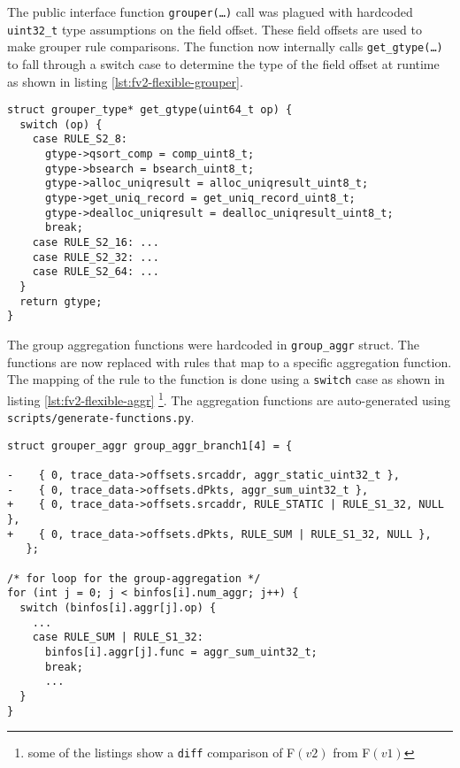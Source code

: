 The public interface function \texttt{grouper(\ldots)} call was plagued with
hardcoded \texttt{uint32\_t} type assumptions on the field offset. These field
offsets  are used to
make grouper rule comparisons. The function now internally calls
\texttt{get\_gtype(\ldots)} to fall through a switch case to determine the
type of the field offset at runtime as shown in listing
\ref{lst:fv2-flexible-grouper}.

\begin{lstlisting}
struct grouper_type* get_gtype(uint64_t op) {
  switch (op) {
    case RULE_S2_8:
      gtype->qsort_comp = comp_uint8_t;
      gtype->bsearch = bsearch_uint8_t;
      gtype->alloc_uniqresult = alloc_uniqresult_uint8_t;
      gtype->get_uniq_record = get_uniq_record_uint8_t;
      gtype->dealloc_uniqresult = dealloc_uniqresult_uint8_t;
      break;
    case RULE_S2_16: ...
    case RULE_S2_32: ...
    case RULE_S2_64: ...
  }
  return gtype;
}
\end{lstlisting}



The group aggregation functions were hardcoded in \texttt{group\_aggr} struct.
The functions  are now replaced with
rules that map to a specific aggregation function. The mapping of the rule to
the function is done using a \texttt{switch} case as shown in listing
\ref{lst:fv2-flexible-aggr} \footnote{some of the listings show a
\texttt{diff} comparison of F$(v2)$ from F$(v1)$}. The aggregation functions
are auto-generated using \texttt{scripts/generate-functions.py}.

\begin{lstlisting}
struct grouper_aggr group_aggr_branch1[4] = {

-    { 0, trace_data->offsets.srcaddr, aggr_static_uint32_t },
-    { 0, trace_data->offsets.dPkts, aggr_sum_uint32_t },
+    { 0, trace_data->offsets.srcaddr, RULE_STATIC | RULE_S1_32, NULL },
+    { 0, trace_data->offsets.dPkts, RULE_SUM | RULE_S1_32, NULL },
   };

/* for loop for the group-aggregation */
for (int j = 0; j < binfos[i].num_aggr; j++) {
  switch (binfos[i].aggr[j].op) {
    ...
    case RULE_SUM | RULE_S1_32:
      binfos[i].aggr[j].func = aggr_sum_uint32_t;
      break;
      ...
  }
}
\end{lstlisting}

